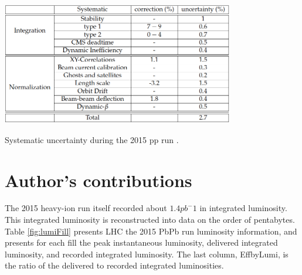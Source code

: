 \begin{table}[]
\begin{centering}
\includegraphics[width=4in]{Chapter4/importfigs/CMS-PAS-LUM-15-001_Table_001.png}
\par\end{centering}
\caption{Systematic uncertainty during the 2015 pp run \cite{CMS:2013gfa}. \label{fig:sysLumiError}}
\end{table}


\section{Author's contributions}

The 2015 heavy-ion run itself recorded about $1.4 pb^-1$ in integrated luminosity. This integrated luminosity is reconstructed into data on the order of pentabytes. Table \ref{fig:lumiFill} presents LHC the 2015 PbPb run luminosity information, and presents for each fill the peak instantaneous luminosity, delivered integrated luminosity, and recorded integrated luminosity. The last column, EffbyLumi, is the ratio of the delivered to recorded integrated luminosities.  

